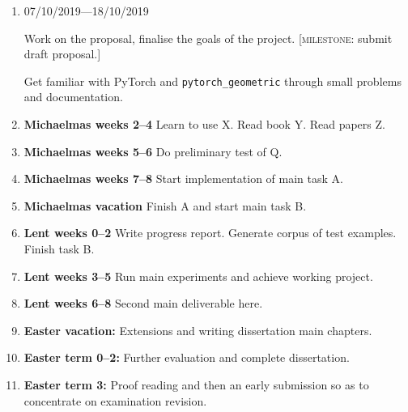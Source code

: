 \documentclass[12pt,a4paper,twoside]{article}
\begin{document}
\begin{enumerate}
\item 07/10/2019—18/10/2019

Work on the proposal, finalise the goals of the project. [\textsc{milestone}: submit draft proposal.]

Get familiar with PyTorch and \texttt{pytorch\_geometric} through small problems and documentation.



\item \textbf{Michaelmas weeks 2--4} Learn to use X. Read book Y. Read papers Z.

\item \textbf{Michaelmas weeks 5--6} Do preliminary test of Q.

\item \textbf{Michaelmas weeks 7--8} Start implementation of main task A.

\item \textbf{Michaelmas vacation} Finish A and start main task B.

\item \textbf{Lent weeks 0--2} Write progress report. Generate corpus of
  test examples. Finish task B.

\item \textbf{Lent weeks 3--5} Run main experiments and achieve working project.

\item \textbf{Lent weeks 6--8} Second main deliverable here.

\item \textbf{Easter vacation:} Extensions and writing dissertation main
  chapters.

\item \textbf{Easter term 0--2:}  Further evaluation and complete dissertation.

\item \textbf{Easter term 3:} Proof reading and then an early submission
  so as to concentrate on examination revision.

\end{enumerate}



\end{document}
